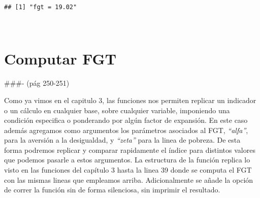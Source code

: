 \documentclass[
]{book}
\newenvironment{Shaded}{\begin{snugshade}}{\end{snugshade}}
\newcommand{\AttributeTok}[1]{\textcolor[rgb]{0.77,0.63,0.00}{#1}}
\newcommand{\CommentTok}[1]{\textcolor[rgb]{0.56,0.35,0.01}{\textit{#1}}}
\newcommand{\ConstantTok}[1]{\textcolor[rgb]{0.00,0.00,0.00}{#1}}
\newcommand{\DecValTok}[1]{\textcolor[rgb]{0.00,0.00,0.81}{#1}}
\newcommand{\FunctionTok}[1]{\textcolor[rgb]{0.00,0.00,0.00}{#1}}
\newcommand{\NormalTok}[1]{#1}
\newcommand{\OtherTok}[1]{\textcolor[rgb]{0.56,0.35,0.01}{#1}}
\newcommand{\SpecialCharTok}[1]{\textcolor[rgb]{0.00,0.00,0.00}{#1}}
\newcommand{\StringTok}[1]{\textcolor[rgb]{0.31,0.60,0.02}{#1}}
\begin{document}
\begin{Shaded}
\end{Shaded}

\begin{verbatim}
## [1] "fgt = 19.02"
\end{verbatim}

~

\hypertarget{computar-fgt}{%
\section{Computar FGT}\label{computar-fgt}}

\#\#\#- (pág 250-251)

Como ya vimos en el capitulo 3, las funciones nos permiten replicar un indicador o un cálculo en cualquier base, sobre cualquier variable, imponiendo una condición especifica o ponderando por algún factor de expansión. En este caso además agregamos como argumentos los parámetros asociados al FGT, \emph{``alfa''}, para la aversión a la desigualdad, y \emph{``zeta''} para la linea de pobreza. De esta forma podremos replicar y comparar rapidamente el índice para distintos valores que podemos pasarle a estos argumentos. La estructura de la función replica lo visto en las funciones del capítulo 3 hasta la linea 39 donde se computa el FGT con las mismas lineas que empleamos arriba. Adicionalmente se añade la opción de correr la función sin de forma silenciosa, sin imprimir el resultado.
\end{document}
